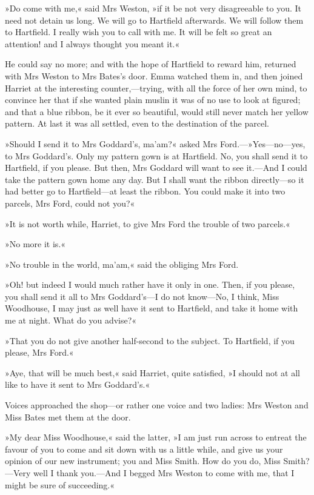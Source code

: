 »Do come with me,« said Mrs Weston, »if it be not very disagreeable to you. It need not detain us long. We will go to Hartfield afterwards. We will follow them to Hartfield. I really wish you to call with me. It will be felt so great an attention! and I always thought you meant it.«

He could say no more; and with the hope of Hartfield to reward him, returned with Mrs Weston to Mrs Bates's door. Emma watched them in, and then joined Harriet at the interesting counter,—trying, with all the force of her own mind, to convince her that if she wanted plain muslin it was of no use to look at figured; and that a blue ribbon, be it ever so beautiful, would still never match her yellow pattern. At last it was all settled, even to the destination of the parcel.

»Should I send it to Mrs Goddard's, ma'am?« asked Mrs Ford.—»Yes—no—yes, to Mrs Goddard's. Only my pattern gown is at Hartfield. No, you shall send it to Hartfield, if you please. But then, Mrs Goddard will want to see it.—And I could take the pattern gown home any day. But I shall want the ribbon directly—so it had better go to Hartfield—at least the ribbon. You could make it into two parcels, Mrs Ford, could not you?«

»It is not worth while, Harriet, to give Mrs Ford the trouble of two parcels.«

»No more it is.«

»No trouble in the world, ma'am,« said the obliging Mrs Ford.

»Oh! but indeed I would much rather have it only in one. Then, if you please, you shall send it all to Mrs Goddard's—I do not know—No, I think, Miss Woodhouse, I may just as well have it sent to Hartfield, and take it home with me at night. What do you advise?«

»That you do not give another half-second to the subject. To Hartfield, if you please, Mrs Ford.«

»Aye, that will be much best,« said Harriet, quite satisfied, »I should not at all like to have it sent to Mrs Goddard's.«

Voices approached the shop—or rather one voice and two ladies: Mrs Weston and Miss Bates met them at the door.

»My dear Miss Woodhouse,« said the latter, »I am just run across to entreat the favour of you to come and sit down with us a little while, and give us your opinion of our new instrument; you and Miss Smith. How do you do, Miss Smith?—Very well I thank you.—And I begged Mrs Weston to come with me, that I might be sure of succeeding.«

